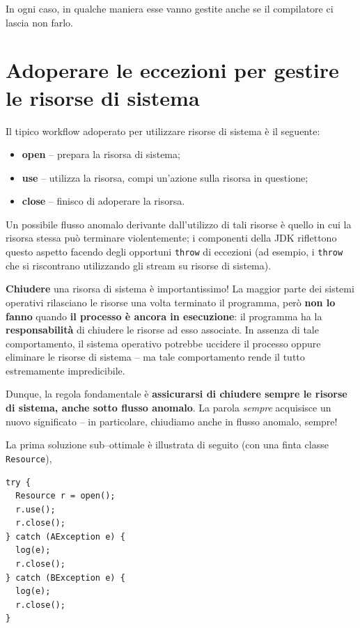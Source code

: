 \documentclass[\fontsizeclass,twocolumn]{\classname}
\theoremstyle{definition}
\theoremstyle{definition}
\begin{document}
In ogni caso, in qualche maniera esse vanno gestite anche se il compilatore ci
lascia non farlo.

\chapter{Adoperare le eccezioni per gestire le risorse di sistema}

Il tipico workflow adoperato per utilizzare risorse di sistema è il seguente:
\begin{itemize}
    \item \textbf{open} -- prepara la risorsa di sistema;
    \item \textbf{use} -- utilizza la risorsa, compi un'azione sulla risorsa in
        questione;
    \item \textbf{close} -- finisco di adoperare la risorsa.
\end{itemize}

Un possibile flusso anomalo derivante dall'utilizzo di tali risorse è quello in
cui la risorsa stessa può terminare violentemente; i componenti della JDK
riflettono questo aspetto facendo degli opportuni \texttt{throw} di eccezioni
(ad esempio, i \texttt{throw} che si riscontrano utilizzando gli stream su
risorse di sistema).

\textbf{Chiudere} una risorsa di sistema è importantissimo! La maggior parte
dei sistemi operativi rilasciano le risorse una volta terminato il programma,
però \textbf{non lo fanno} quando \textbf{il processo è ancora in esecuzione}:
il programma ha la \textbf{responsabilità} di chiudere le risorse ad esso
associate. In assenza di tale comportamento, il sistema operativo potrebbe
uccidere il processo oppure eliminare le risorse di sistema -- ma tale
comportamento rende il tutto estremamente impredicibile.

Dunque, la regola fondamentale è \textbf{assicurarsi di chiudere sempre le
risorse di sistema, anche sotto flusso anomalo}. La parola \emph{sempre}
acquisisce un nuovo significato -- in particolare, chiudiamo anche in flusso
anomalo, sempre!

La prima soluzione sub--ottimale è illustrata di seguito (con una finta classe
\texttt{Resource}),

\begin{lstlisting}
try {
  Resource r = open();
  r.use();
  r.close();
} catch (AException e) {
  log(e);
  r.close();
} catch (BException e) {
  log(e);
  r.close();
}
\end{lstlisting}
\end{document}
